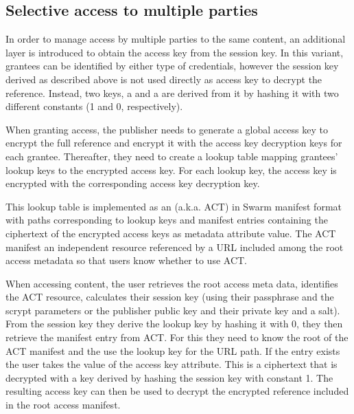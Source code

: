 \subsection{Selective access to multiple parties}

In order to manage access by multiple parties to the same content, an additional layer is introduced to obtain the access key from the session key. In this variant, grantees can be identified by either type of credentials, however the session key derived as
described above is not used directly as access key to decrypt the reference. Instead, two keys, a  and a  are derived from it by hashing it with two different constants (1 and 0, respectively).

When granting access, the publisher needs to generate a global access key to encrypt the full reference and encrypt it with the
access key decryption keys for each grantee. Thereafter, they need to create a lookup table mapping grantees' lookup keys to the encrypted access key. For each lookup key, the access key is encrypted with the corresponding access key decryption key.

This lookup table is implemented as an  (a.k.a. ACT) in Swarm manifest format with paths corresponding to lookup keys and manifest entries containing the ciphertext of the encrypted access keys as metadata attribute value. The ACT manifest an independent resource referenced by a URL included among the root access metadata so that users know whether to use ACT.

When accessing content, the user retrieves the root access meta data, identifies the ACT resource, calculates their session key (using their passphrase and the scrypt parameters or the publisher public key and their private key and a salt). From the session key they derive the lookup key by hashing it with 0, they then retrieve the manifest entry from ACT. For this they need to know the root of the ACT manifest and the use the lookup key for the URL path. If the entry exists the user takes the value of the access key attribute. This is a ciphertext that is decrypted with a key derived by hashing the session key with constant 1. The resulting access key can then be used to decrypt the encrypted reference included in the root access manifest.

